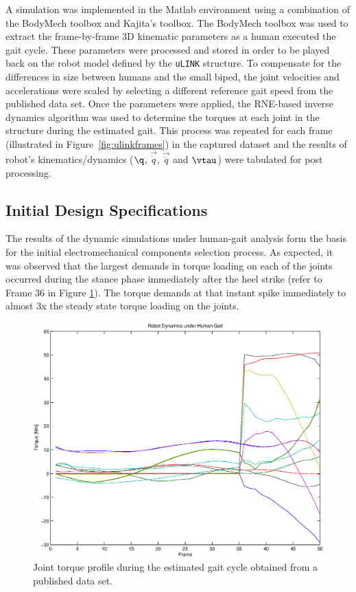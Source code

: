 A simulation was implemented in the Matlab environment using a combination of the BodyMech toolbox and Kajita's toolbox. The BodyMech toolbox was used to extract the frame-by-frame 3D kinematic parameters as a human executed the gait cycle. These parameters were processed and stored in order to be played back on the robot model defined by the \texttt{uLINK} structure. To compensate for the differences in size between humans and the small biped, the joint velocities and accelerations were scaled by selecting a different reference gait speed from the published data set. Once the parameters were applied, the RNE-based inverse dynamics algorithm was used to determine the torques at each joint in the structure during the estimated gait. This process was repeated for each frame (illustrated in Figure~\ref{fig:ulinkframes}) in the captured dataset and the results of robot's kinematics/dynamics ($\q$, $\vec{\dot{q}}$, $\vec{\ddot{q}}$ and $\vtau$) were tabulated for post processing. 


\subsection{Initial Design Specifications} %
\label{sec:initial_design_requirements}
The results of the dynamic simulations under human-gait analysis form the basis for the initial electromechanical components selection process. As expected, it was observed that the largest demands in torque loading on each of the joints occurred during the stance phase immediately after the heel strike (refer to Frame 36 in Figure \ref{fig:gaitplot}). The torque demands at that instant spike immediately to almost 3x the steady state torque loading on the joints. 

\begin{figure}[!h]
	\begin{center}
    \includegraphics[scale=0.6]{fig/design/gaitplot.eps}
	\end{center}
  \caption{Joint torque profile during the estimated gait cycle obtained from a published data set.}
  	\label{fig:gaitplot}
\end{figure}


